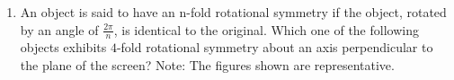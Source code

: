 \documentclass[journal,12pt,onecolumn]{IEEEtran}
\theoremstyle{remark}
\begin{document}
\begin{enumerate}
\item An object is said to have an n-fold rotational symmetry if the object, rotated by an angle of $\frac{2\pi}{n}$, is identical to the original. Which one of the following objects exhibits $4$-fold rotational symmetry about an axis perpendicular to the plane of the screen? Note: The figures shown are representative. \hfill{}
\begin{enumerate}
\end{enumerate}


\end{enumerate}
\end{document}

